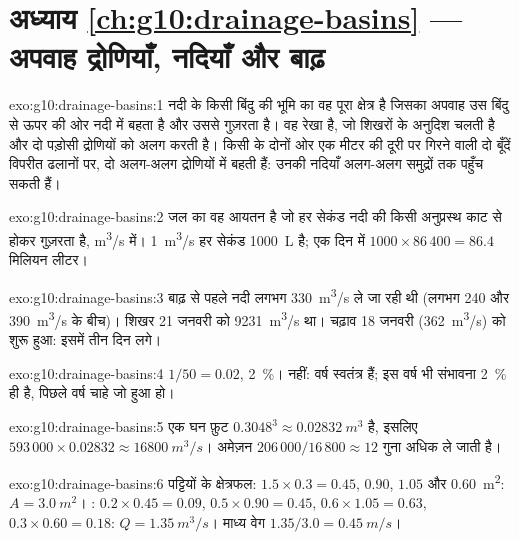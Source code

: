 \section*{अध्याय \ref{ch:g10:drainage-basins} --- अपवाह द्रोणियाँ, नदियाँ और बाढ़}

\begin{solution}{exo:g10:drainage-basins:1}
नदी के किसी बिंदु की  भूमि का वह पूरा क्षेत्र है जिसका
अपवाह उस बिंदु से ऊपर की ओर नदी में बहता है और उससे गुज़रता है। 
वह रेखा है, जो शिखरों के अनुदिश चलती है और दो पड़ोसी द्रोणियों को अलग करती है।
किसी  के दोनों ओर एक मीटर की दूरी पर गिरने वाली दो बूँदें विपरीत
ढलानों पर, दो अलग-अलग द्रोणियों में बहती हैं: उनकी नदियाँ अलग-अलग समुद्रों तक पहुँच सकती हैं।
\end{solution}

\begin{solution}{exo:g10:drainage-basins:2}
 जल का वह आयतन है जो हर सेकंड नदी की किसी अनुप्रस्थ काट से होकर
गुज़रता है, \unit{m^3/s} में। \qty{1}{m^3/s} हर
सेकंड \qty{1000}{L} है; एक दिन में $1000 \times 86\,400 = 86.4$ मिलियन लीटर।
\end{solution}

\begin{solution}{exo:g10:drainage-basins:3}
बाढ़ से पहले नदी लगभग \qty{330}{m^3/s} ले जा रही थी (लगभग
\num{240} और \qty{390}{m^3/s} के बीच)। शिखर 21 जनवरी को \qty{9231}{m^3/s}
था। चढ़ाव 18 जनवरी (\qty{362}{m^3/s}) को शुरू हुआ: इसमें तीन
दिन लगे।
\end{solution}

\begin{solution}{exo:g10:drainage-basins:4}
$1/50 = 0.02$, \qty{2}{\percent}। नहीं: वर्ष स्वतंत्र हैं; इस वर्ष भी संभावना
\qty{2}{\percent} ही है, पिछले वर्ष चाहे जो हुआ हो।
\end{solution}

\begin{solution}{exo:g10:drainage-basins:5}
एक घन फ़ुट $0.3048^3 \approx \qty{0.02832}{m^3}$ है, इसलिए
$593\,000 \times 0.02832 \approx \qty{16800}{m^3/s}$। अमेज़न
$206\,000/16\,800 \approx 12$ गुना अधिक ले जाती है।
\end{solution}

\begin{solution}{exo:g10:drainage-basins:6}
पट्टियों के क्षेत्रफल: $1.5 \times 0.3 = 0.45$, $0.90$, $1.05$ और \qty{0.60}{m^2}:
$A = \qty{3.0}{m^2}$। : $0.2 \times 0.45 = 0.09$, $0.5 \times 0.90
= 0.45$, $0.6 \times 1.05 = 0.63$, $0.3 \times 0.60 = 0.18$: $Q =
\qty{1.35}{m^3/s}$। माध्य वेग $1.35/3.0 = \qty{0.45}{m/s}$।
\end{solution}

